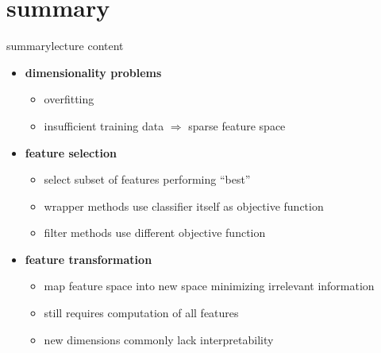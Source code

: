         
        
    \section{summary}
        \begin{frame}{summary}{lecture content}
            \begin{itemize}
                \item   \textbf{dimensionality problems}
                    \begin{itemize}
                        \item   overfitting
                        \item   insufficient training data $\Rightarrow$ sparse feature space
                    \end{itemize}
                \bigskip
                \item   \textbf{feature selection}
                    \begin{itemize}
                        \item   select subset of features performing ``best''
                        \item   wrapper methods use classifier itself as objective function
                        \item   filter methods use different objective function
                    \end{itemize}
                \bigskip
                \item   \textbf{feature transformation}
                    \begin{itemize}
                        \item   map feature space into new space minimizing irrelevant information
                        \item   still requires computation of all features
                        \item   new dimensions commonly lack interpretability
                    \end{itemize}
            \end{itemize}
        \end{frame}

